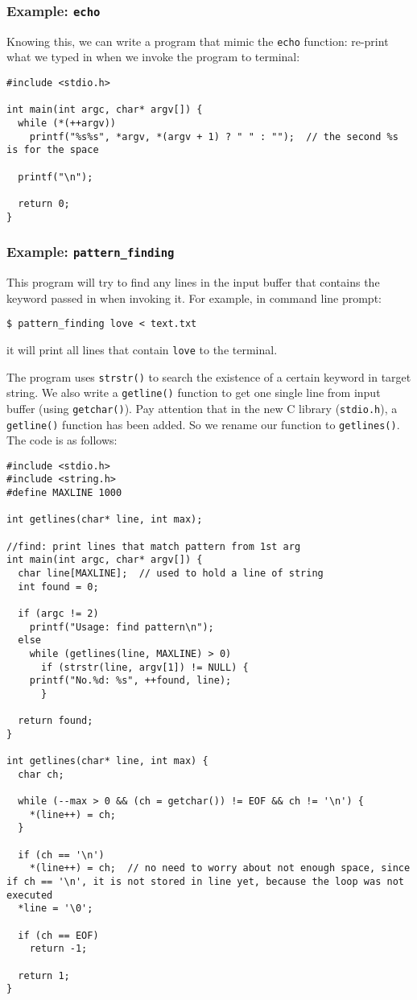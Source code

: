 \documentclass[12pt]{article}
\begin{document}
\subsubsection{Example: \texttt{echo}}
\label{sec:org19a4b20}
Knowing this, we can write a program that mimic the \texttt{echo} function: re-print what we typed in when we invoke the program to terminal:
\begin{verbatim}
#include <stdio.h>

int main(int argc, char* argv[]) {
  while (*(++argv))
    printf("%s%s", *argv, *(argv + 1) ? " " : "");  // the second %s is for the space

  printf("\n");

  return 0;
}
\end{verbatim}

\subsubsection{Example: \texttt{pattern\_finding}}
\label{sec:org7e49f70}
This program will try to find any lines in the input buffer that contains the keyword passed in when invoking it. For example, in command line prompt:
\begin{verbatim}
$ pattern_finding love < text.txt
\end{verbatim}
it will print all lines that contain \texttt{love} to the terminal.

The program uses \texttt{strstr()} to search the existence of a certain keyword in target string. We also write a \texttt{getline()} function to get one single line from input buffer (using \texttt{getchar()}). Pay attention that in the new C library (\texttt{stdio.h}), a \texttt{getline()} function has been added. So we rename our function to \texttt{getlines()}. The code is as follows:
\begin{verbatim}
#include <stdio.h>
#include <string.h>
#define MAXLINE 1000

int getlines(char* line, int max);

//find: print lines that match pattern from 1st arg 
int main(int argc, char* argv[]) {
  char line[MAXLINE];  // used to hold a line of string
  int found = 0;

  if (argc != 2)
    printf("Usage: find pattern\n");
  else
    while (getlines(line, MAXLINE) > 0)
      if (strstr(line, argv[1]) != NULL) {
	printf("No.%d: %s", ++found, line);
      }

  return found;
}

int getlines(char* line, int max) {
  char ch;

  while (--max > 0 && (ch = getchar()) != EOF && ch != '\n') {
    *(line++) = ch;
  }

  if (ch == '\n')
    *(line++) = ch;  // no need to worry about not enough space, since if ch == '\n', it is not stored in line yet, because the loop was not executed
  *line = '\0';

  if (ch == EOF)
    return -1;

  return 1;
}
\end{verbatim}
\end{document}
